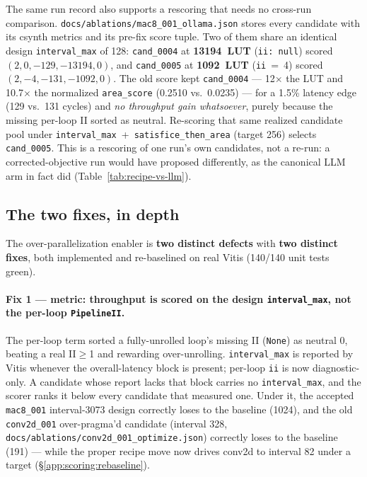 The same run record also supports a rescoring that needs no cross-run comparison.
\texttt{docs/ablations/mac8\_001\_ollama.json} stores every candidate with its csynth
metrics and its pre-fix score tuple. Two of them share an identical design
\texttt{interval\_max} of 128: \texttt{cand\_0004} at \textbf{13194~LUT}
(\texttt{ii: null}) scored $(2,0,-129,-13194,0)$, and \texttt{cand\_0005} at
\textbf{1092~LUT} (\texttt{ii}~=~4) scored $(2,-4,-131,-1092,0)$. The old score kept
\texttt{cand\_0004} --- 12$\times$ the LUT and 10.7$\times$ the normalized
\texttt{area\_score} (0.2510 vs.\ 0.0235) --- for a 1.5\% latency edge (129 vs.\ 131
cycles) and \emph{no throughput gain whatsoever}, purely because the missing per-loop
II sorted as neutral. Re-scoring that same realized
candidate pool under \texttt{interval\_max}~+~\texttt{satisfice\_then\_area} (target
256) selects \texttt{cand\_0005}. This is a rescoring of one run's own candidates, not
a re-run: a corrected-objective run would have proposed differently, as the canonical
LLM arm in fact did (Table~\ref{tab:recipe-vs-llm}).



\subsection{The two fixes, in depth}\label{app:scoring:fixes}

The over-parallelization enabler is \textbf{two distinct defects} with \textbf{two
distinct fixes}, both implemented and re-baselined on real Vitis (140/140 unit tests
green).

\paragraph{Fix 1 --- metric: throughput is scored on the design \texttt{interval\_max}, not the per-loop \texttt{PipelineII}.}
The per-loop term sorted a fully-unrolled loop's missing II (\texttt{None}) as neutral
0, beating a real II$\geq$1 and rewarding over-unrolling. \texttt{interval\_max} is
reported by Vitis whenever the overall-latency block is present; per-loop
\texttt{ii} is now diagnostic-only. A candidate whose report lacks that block
carries no \texttt{interval\_max}, and the scorer ranks it below every candidate
that measured one. Under it, the
accepted \texttt{mac8\_001} interval-3073 design correctly loses to the baseline
(1024), and the old \texttt{conv2d\_001} over-pragma'd candidate (interval 328,
\texttt{docs/ablations/conv2d\_001\_optimize.json})
correctly loses to the baseline (191) --- while the proper recipe move now drives
conv2d to interval 82 under a target (\S\ref{app:scoring:rebaseline}).

